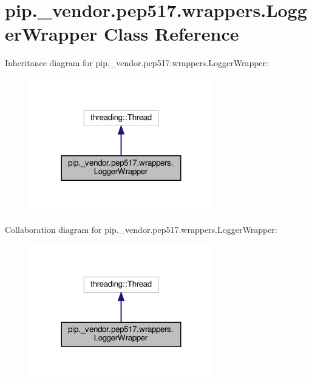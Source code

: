 \hypertarget{classpip_1_1__vendor_1_1pep517_1_1wrappers_1_1LoggerWrapper}{}\section{pip.\+\_\+vendor.\+pep517.\+wrappers.\+Logger\+Wrapper Class Reference}
\label{classpip_1_1__vendor_1_1pep517_1_1wrappers_1_1LoggerWrapper}


Inheritance diagram for pip.\+\_\+vendor.\+pep517.\+wrappers.\+Logger\+Wrapper\+:
\nopagebreak
\begin{figure}[H]
\begin{center}
\leavevmode
\includegraphics[width=227pt]{classpip_1_1__vendor_1_1pep517_1_1wrappers_1_1LoggerWrapper__inherit__graph}
\end{center}
\end{figure}


Collaboration diagram for pip.\+\_\+vendor.\+pep517.\+wrappers.\+Logger\+Wrapper\+:
\nopagebreak
\begin{figure}[H]
\begin{center}
\leavevmode
\includegraphics[width=227pt]{classpip_1_1__vendor_1_1pep517_1_1wrappers_1_1LoggerWrapper__coll__graph}
\end{center}
\end{figure}
